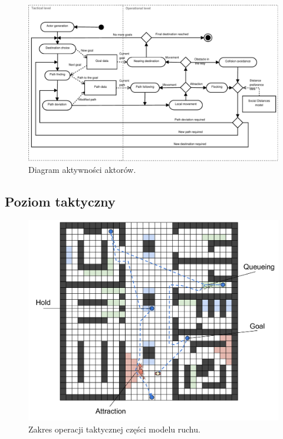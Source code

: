\documentclass[a4paper, 12pt]{article}
\begin{document}
    \begin{figure}[h!]
        \centering
        \includegraphics[scale=0.7]{./img/ActorActivity.pdf}
        \caption{Diagram aktywności aktorów.}
        \label{fig:actor-activity}
    \end{figure}


        \subsection{Poziom taktyczny}
        \label{sec:tactical}

        \begin{figure}[h!]
            \centering
            \includegraphics[scale=0.3]{./img/Tactical.pdf}
            \caption{Zakres operacji taktycznej części modelu ruchu.}
            \label{fig:tactical}
        \end{figure}
\end{document}
